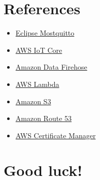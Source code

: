 \documentclass{article}
\begin{document}
\section{References}\label{references}
\begin{itemize}
  \item \href{https://mosquitto.org/}{Eclipse Mostquitto}
  \item \href{https://docs.aws.amazon.com/iot/latest/developerguide/what-is-aws-iot.html}{AWS IoT Core}
  \item \href{https://docs.aws.amazon.com/firehose/latest/dev/what-is-this-service.html}{Amazon Data Firehose}
  \item \href{https://docs.aws.amazon.com/lambda/latest/dg/welcome.html}{AWS Lambda}
  \item \href{https://docs.aws.amazon.com/AmazonS3/latest/userguide/Welcome.html}{Amazon S3}
  \item \href{https://docs.aws.amazon.com/Route53/latest/DeveloperGuide/Welcome.html}{Amazon Route 53}
  \item \href{https://docs.aws.amazon.com/acm/latest/userguide/acm-overview.html}{AWS Certificate Manager}
\end{itemize}
\section*{Good luck!}
\end{document}
